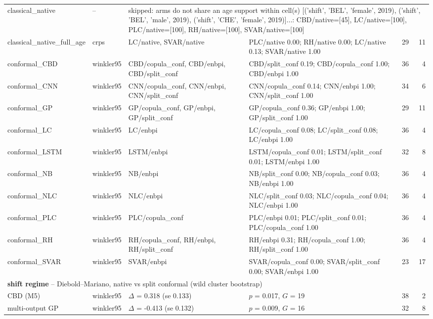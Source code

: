 {\begin{longtable}{@{}llp{3.2cm}p{5.2cm}rr@{}}
\midrule
classical\_native & -- & \multicolumn{4}{p{9.6cm}}{skipped: arms do not share an age support within cell(s) [('shift', 'BEL', 'female', 2019), ('shift', 'BEL', 'male', 2019), ('shift', 'CHE', 'female', 2019)]...: CBD/native=[45], LC/native=[100], PLC/native=[100], RH/native=[100], SVAR/native=[100]} \\
classical\_native\_full\_age & crps & LC/native, SVAR/native & PLC/native 0.00; RH/native 0.00; LC/native 0.13; SVAR/native 1.00 & 29 & 11 \\
conformal\_CBD & winkler95 & CBD/copula\_conf, CBD/enbpi, CBD/split\_conf & CBD/split\_conf 0.19; CBD/copula\_conf 1.00; CBD/enbpi 1.00 & 36 & 4 \\
conformal\_CNN & winkler95 & CNN/copula\_conf, CNN/enbpi, CNN/split\_conf & CNN/copula\_conf 0.14; CNN/enbpi 1.00; CNN/split\_conf 1.00 & 34 & 6 \\
conformal\_GP & winkler95 & GP/copula\_conf, GP/enbpi, GP/split\_conf & GP/copula\_conf 0.36; GP/enbpi 1.00; GP/split\_conf 1.00 & 29 & 11 \\
conformal\_LC & winkler95 & LC/enbpi & LC/copula\_conf 0.08; LC/split\_conf 0.08; LC/enbpi 1.00 & 36 & 4 \\
conformal\_LSTM & winkler95 & LSTM/enbpi & LSTM/copula\_conf 0.01; LSTM/split\_conf 0.01; LSTM/enbpi 1.00 & 32 & 8 \\
conformal\_NB & winkler95 & NB/enbpi & NB/split\_conf 0.00; NB/copula\_conf 0.03; NB/enbpi 1.00 & 36 & 4 \\
conformal\_NLC & winkler95 & NLC/enbpi & NLC/split\_conf 0.03; NLC/copula\_conf 0.04; NLC/enbpi 1.00 & 36 & 4 \\
conformal\_PLC & winkler95 & PLC/copula\_conf & PLC/enbpi 0.01; PLC/split\_conf 0.01; PLC/copula\_conf 1.00 & 36 & 4 \\
conformal\_RH & winkler95 & RH/copula\_conf, RH/enbpi, RH/split\_conf & RH/enbpi 0.31; RH/copula\_conf 1.00; RH/split\_conf 1.00 & 36 & 4 \\
conformal\_SVAR & winkler95 & SVAR/enbpi & SVAR/copula\_conf 0.00; SVAR/split\_conf 0.00; SVAR/enbpi 1.00 & 23 & 17 \\
\multicolumn{6}{l}{\textbf{shift regime} -- Diebold--Mariano, native vs split conformal (wild cluster bootstrap)} \\
\midrule
CBD (M5) & winkler95 & $\Delta$ = 0.318 (se 0.133) & $p$ = 0.017, $G$ = 19 & 38 & 2 \\
multi-output GP & winkler95 & $\Delta$ = -0.413 (se 0.132) & $p$ = 0.009, $G$ = 16 & 32 & 8 \\

\end{longtable}}
